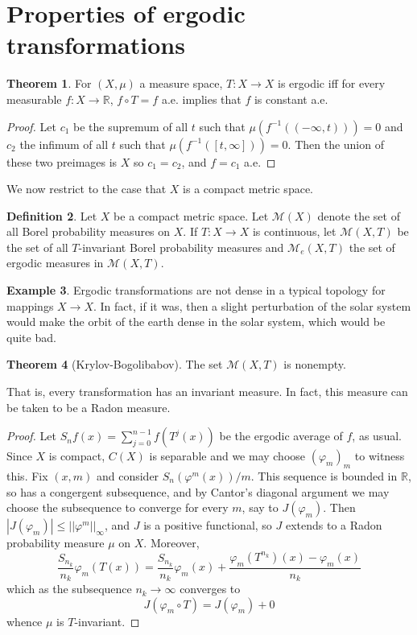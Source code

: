 \documentclass[12pt]{report}
\newcommand{\RR}{\mathbb{R}}
\theoremstyle{definition}
\newtheorem{theorem}{Theorem}[chapter]
\newtheorem{definition}[theorem]{Definition}
\newtheorem{example}[theorem]{Example}
\begin{document}
\section{Properties of ergodic transformations}
\begin{theorem}
For $(X, \mu)$ a measure space, $T: X \to X$ is ergodic iff for every measurable $f: X \to \RR$, $f \circ T = f$ a.e. implies that $f$ is constant a.e.
\end{theorem}
\begin{proof}
Let $c_1$ be the supremum of all $t$ such that $\mu(f^{-1}((-\infty, t))) = 0$ and $c_2$ the infimum of all $t$ such that $\mu(f^{-1}([t, \infty])) = 0$. Then the union of these two preimages is $X$ so $c_1 = c_2$, and $f = c_1$ a.e.
\end{proof}
We now restrict to the case that $X$ is a compact metric space.
\begin{definition}
Let $X$ be a compact metric space. Let $\mathcal M(X)$ denote the set of all Borel probability measures on $X$. If $T: X \to X$ is continuous, let $\mathcal M(X, T)$ be the set of all $T$-invariant Borel probability measures and $\mathcal M_e(X, T)$ the set of ergodic measures in $\mathcal M(X, T)$.
\end{definition}
\begin{example}
Ergodic transformations are not dense in a typical topology for mappings $X \to X$. In fact, if it was, then a slight perturbation of the solar system would make the orbit of the earth dense in the solar system, which would be quite bad.
\end{example}
\begin{theorem}[Krylov-Bogolibabov]
The set $\mathcal M(X, T)$ is nonempty.
\end{theorem}
That is, every transformation has an invariant measure. In fact, this measure can be taken to be a Radon measure.
\begin{proof}
Let $S_nf(x) = \sum_{j=0}^{n-1}f(T^j(x))$ be the ergodic average of $f$, as usual. Since $X$ is compact, $C(X)$ is separable and we may choose $(\varphi_m)_m$ to witness this. Fix $(x, m)$ and consider $S_n(\varphi^m(x))/m$. This sequence is bounded in $\RR$, so has a congergent subsequence, and by Cantor's diagonal argument we may choose the subsequence to converge for every $m$, say to $J(\varphi_m)$. Then $|J(\varphi_m)| \leq ||\varphi^m||_\infty$, and $J$ is a positive functional, so $J$ extends to a Radon probability measure $\mu$ on $X$. Moreover,
$$\frac{S_{n_k}}{n_k}\varphi_m(T(x)) = \frac{S_{n_k}}{n_k} \varphi_m(x) + \frac{\varphi_m(T^{n_k})(x) - \varphi_m(x)}{n_k}$$
which as the subsequence $n_k \to \infty$ converges to
$$J(\varphi_m \circ T) = J(\varphi_m) + 0$$
whence $\mu$ is $T$-invariant.
\end{proof}
\end{document}
